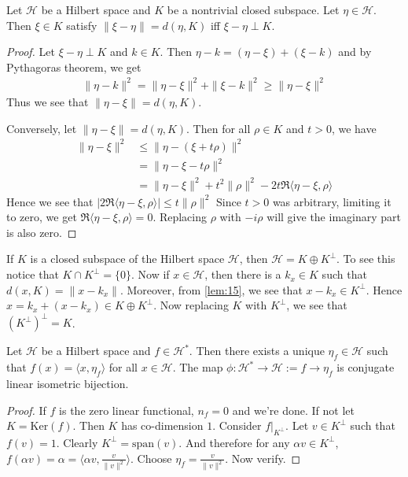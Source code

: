 \begin{lemma}
  \label{lem:15}
  Let $\mathcal{H}$ be a Hilbert space and $K$ be a nontrivial closed subspace.
  Let $\eta \in \mathcal{H}$. Then $\xi \in K$ satisfy $\|\xi -
  \eta\| = d(\eta, K)$ iff
  $\xi - \eta \perp K$.
\end{lemma}
\begin{proof}
  Let $\xi - \eta \perp K$ and $k \in K$. Then $\eta - k = (\eta -
  \xi) + (\xi - k)$ and by Pythagoras theorem, we get
  \begin{align*}
    \|\eta - k\|^2 = \|\eta - \xi\|^2 + \|\xi - k\|^2 \ge \|\eta - \xi\|^2
  \end{align*}
  Thus we see that $\|\eta - \xi\| = d(\eta, K)$.

  \marginnote{ \scriptsize  \textit{\textcolor{red}{cool proof technique}}}
  Conversely, let  $\|\eta - \xi\|= d(\eta, K)$. Then for all $\rho
  \in K$ and $t > 0$, we have
  \begin{align*}
    \|\eta - \xi\|^2 &\le \|\eta - (\xi + t\rho)\|^2  \\
    & = \| \eta - \xi -  t\rho\|^2 \\
    & = \|\eta - \xi\|^2 + t^2\|\rho\|^2 - 2t\Re \langle \eta - \xi ,
    \rho \rangle
  \end{align*}
  Hence we see that $|2\Re \langle \eta - \xi , \rho \rangle| \le t\|\rho\|^2$
  Since $t>0$ was arbitrary, limiting it to zero, we get $\Re \langle
  \eta - \xi ,  \rho \rangle = 0$. Replacing $\rho$ with $-i \rho$
  will give the imaginary part is also zero.
\end{proof}

\begin{remark}
  \label{KplusKperpisX}
  If $K$ is a closed subspace of the Hilbert space $\mathcal{H}$,
  then $\mathcal{H} = K \oplus K^\perp$. To see this notice that $K
  \cap K^\perp = \{ 0 \}$. Now if $x \in \mathcal{H}$, then there is
  a $k_x \in K$ such that $d(x, K) = \|x- k_x\|$. Moreover, from
  \autoref{lem:15}, we see that $x - k_x \in K^\perp$. Hence $x =
  k_x + (x - k_x) \in K \oplus K^\perp$. Now replacing $K$ with
  $K^\perp$, we see that $(K^\perp)^\perp = K$.
\end{remark}

\begin{theorem}
  Let $\mathcal{H}$ be a Hilbert space and $f \in \mathcal{H}^*$.
  Then there exists a
  unique $\eta_f \in \mathcal{H}$ such that $f(x) = \langle x , \eta_f \rangle $
  for all $ x \in \mathcal{H}$. The map $\phi:  \mathcal{H}^* \to
  \mathcal{H} := f \to \eta_f$ is
  conjugate linear isometric bijection.
\end{theorem}
\begin{proof}
  If $f$ is the zero linear functional, $n_f = 0$ and we're done. If
  not let $K  = \textrm{Ker}(f)$. Then $K$ has co-dimension $1$.
  Consider $f|_{K^\perp}$. Let $v \in K^\perp$ such that $f(v) = 1$.
  Clearly $  K^\perp = \textrm{span}(v)$. And therefore for any
  $\alpha  v \in K^\perp$, $f(\alpha  v) = \alpha = \langle \alpha v
  , \frac{v}{\|v\|^2} \rangle $. Choose $\eta_f = \frac{v}{\|v\|^2}$.
  Now verify.
\end{proof}

